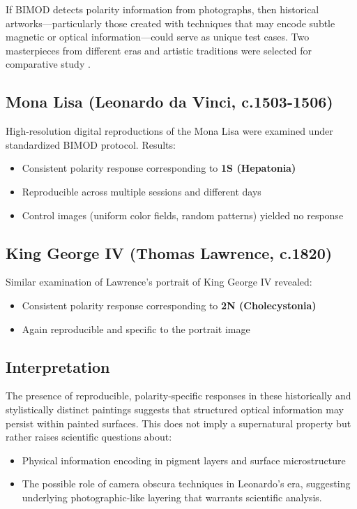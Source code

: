 \documentclass[12pt,a4paper]{article}
\begin{document}
If BIMOD detects polarity information from photographs, then historical artworks—particularly those created with techniques that may encode subtle magnetic or optical information—could serve as unique test cases. Two masterpieces from different eras and artistic traditions were selected for comparative study \cite{yoon2026_100}.

\subsection{Mona Lisa (Leonardo da Vinci, c.1503-1506)}

High-resolution digital reproductions of the Mona Lisa were examined under standardized BIMOD protocol. Results:

\begin{itemize}
    \item Consistent polarity response corresponding to \textbf{1S (Hepatonia)}
    \item Reproducible across multiple sessions and different days
    \item Control images (uniform color fields, random patterns) yielded no response
\end{itemize}

\subsection{King George IV (Thomas Lawrence, c.1820)}

Similar examination of Lawrence's portrait of King George IV revealed:

\begin{itemize}
    \item Consistent polarity response corresponding to \textbf{2N (Cholecystonia)}
    \item Again reproducible and specific to the portrait image
\end{itemize}

\subsection{Interpretation}

The presence of reproducible, polarity-specific responses in these historically and stylistically distinct paintings suggests that structured optical information may persist within painted surfaces. This does not imply a supernatural property but rather raises scientific questions about:

\begin{itemize}
    \item Physical information encoding in pigment layers and surface microstructure
    \item The possible role of camera obscura techniques in Leonardo's era, suggesting underlying photographic-like layering that warrants scientific analysis.
\end{itemize}
\end{document}
